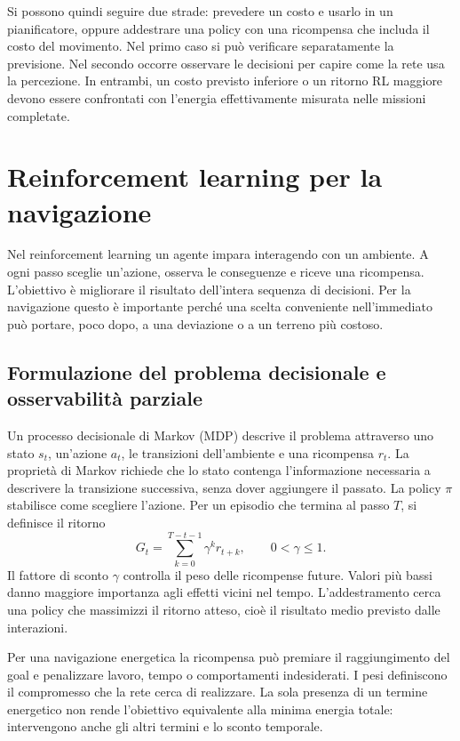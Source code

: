 Si possono quindi seguire due strade: prevedere un costo e usarlo in un pianificatore, oppure addestrare una policy con una ricompensa che includa il costo del movimento. Nel primo caso si può verificare separatamente la previsione. Nel secondo occorre osservare le decisioni per capire come la rete usa la percezione. In entrambi, un costo previsto inferiore o un ritorno RL maggiore devono essere confrontati con l'energia effettivamente misurata nelle missioni completate.

\section{Reinforcement learning per la navigazione}
\label{sec:sota-rl}

Nel reinforcement learning un agente impara interagendo con un ambiente. A ogni passo sceglie un'azione, osserva le conseguenze e riceve una ricompensa. L'obiettivo è migliorare il risultato dell'intera sequenza di decisioni. Per la navigazione questo è importante perché una scelta conveniente nell'immediato può portare, poco dopo, a una deviazione o a un terreno più costoso.

\subsection{Formulazione del problema decisionale e osservabilità parziale}

Un processo decisionale di Markov (MDP) descrive il problema attraverso uno stato $s_t$, un'azione $a_t$, le transizioni dell'ambiente e una ricompensa $r_t$. La proprietà di Markov richiede che lo stato contenga l'informazione necessaria a descrivere la transizione successiva, senza dover aggiungere il passato. La policy $\pi$ stabilisce come scegliere l'azione. Per un episodio che termina al passo $T$, si definisce il ritorno
\begin{equation}
    G_t=\sum_{k=0}^{T-t-1}\gamma^k r_{t+k},
    \qquad 0<\gamma\leq 1.
    \label{eq:sota-ritorno}
\end{equation}
Il fattore di sconto $\gamma$ controlla il peso delle ricompense future. Valori più bassi danno maggiore importanza agli effetti vicini nel tempo. L'addestramento cerca una policy che massimizzi il ritorno atteso, cioè il risultato medio previsto dalle interazioni.

Per una navigazione energetica la ricompensa può premiare il raggiungimento del goal e penalizzare lavoro, tempo o comportamenti indesiderati. I pesi definiscono il compromesso che la rete cerca di realizzare. La sola presenza di un termine energetico non rende l'obiettivo equivalente alla minima energia totale: intervengono anche gli altri termini e lo sconto temporale.

